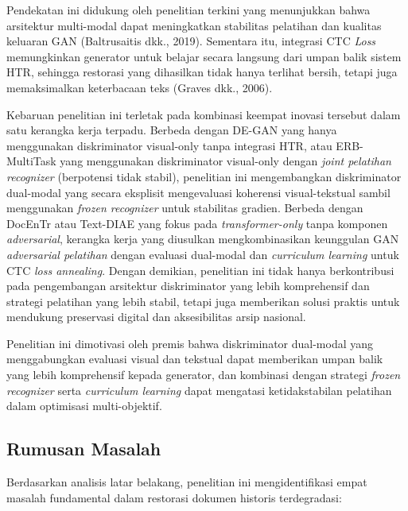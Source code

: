 \documentclass[12pt,a4paper]{book}
\begin{document}
\vspace{0.8em}
Pendekatan ini didukung oleh penelitian terkini yang menunjukkan bahwa arsitektur multi-modal dapat meningkatkan stabilitas pelatihan dan kualitas keluaran GAN (Baltrusaitis dkk., 2019). Sementara itu, integrasi CTC \textit{Loss} memungkinkan generator untuk belajar secara langsung dari umpan balik sistem HTR, sehingga restorasi yang dihasilkan tidak hanya terlihat bersih, tetapi juga memaksimalkan keterbacaan teks (Graves dkk., 2006).

\vspace{0.8em}
Kebaruan penelitian ini terletak pada kombinasi keempat inovasi tersebut dalam satu kerangka kerja terpadu. Berbeda dengan DE-GAN yang hanya menggunakan diskriminator visual-only tanpa integrasi HTR, atau ERB-MultiTask yang menggunakan diskriminator visual-only dengan \textit{joint pelatihan recognizer} (berpotensi tidak stabil), penelitian ini mengembangkan diskriminator dual-modal yang secara eksplisit mengevaluasi koherensi visual-tekstual sambil menggunakan \textit{frozen recognizer} untuk stabilitas gradien. Berbeda dengan DocEnTr atau Text-DIAE yang fokus pada \textit{transformer-only} tanpa komponen \textit{adversarial}, kerangka kerja yang diusulkan mengkombinasikan keunggulan GAN \textit{adversarial pelatihan} dengan evaluasi dual-modal dan \textit{curriculum learning} untuk CTC \textit{loss annealing}. Dengan demikian, penelitian ini tidak hanya berkontribusi pada pengembangan arsitektur diskriminator yang lebih komprehensif dan strategi pelatihan yang lebih stabil, tetapi juga memberikan solusi praktis untuk mendukung preservasi digital dan aksesibilitas arsip nasional.

\vspace{0.8em}
Penelitian ini dimotivasi oleh premis bahwa diskriminator dual-modal yang menggabungkan evaluasi visual dan tekstual dapat memberikan umpan balik yang lebih komprehensif kepada generator, dan kombinasi dengan strategi \textit{frozen recognizer} serta \textit{curriculum learning} dapat mengatasi ketidakstabilan pelatihan dalam optimisasi multi-objektif.
\vspace{0.8em}
\subsection{Rumusan Masalah}
\label{subsec:rumusan-masalah}

Berdasarkan analisis latar belakang, penelitian ini mengidentifikasi empat masalah fundamental dalam restorasi dokumen historis terdegradasi:
\end{document}
